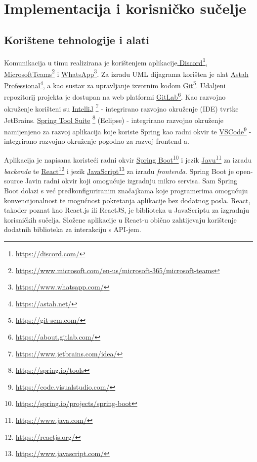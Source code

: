 \chapter{Implementacija i korisničko sučelje}
		
		\section{Korištene tehnologije i alati}
		
			
            Komunikacija u timu realizirana je korištenjem aplikacije\underline{ Discord}\footnote{\url{https://discord.com/}},\underline{ MicrosoftTeams}\footnote{\url{https://www.microsoft.com/en-us/microsoft-365/microsoft-teams}} i \underline{WhatsApp}\footnote{\url{https://www.whatsapp.com/}}. Za izradu UML dijagrama korišten je alat \underline{Astah Professional}\footnote{\url{https://astah.net/}}, a kao sustav za upravljanje izvornim kodom \underline{Git}\footnote{\url{https://git-scm.com/}}. Udaljeni repozitorij projekta je dostupan na web platformi \underline{GitLab}\footnote{\url{https://about.gitlab.com/}}.
            Kao razvojno okruženje korišteni su \underline{IntelliJ}
            \footnote{\url{https://www.jetbrains.com/idea/}} - integrirano razvojno okruženje (IDE) tvrtke JetBrains.
            \underline{Spring Tool Suite}
            \footnote{\url{https://spring.io/tools}} (Eclipse) - integrirano razvojno okruženje namijenjeno za razvoj aplikacija koje koriste Spring kao radni okvir te \underline{VSCode}\footnote{\url{https://code.visualstudio.com/}} - integrirano razvojno okruženje pogodno za razvoj frontend-a.
            
            Aplikacija je napisana koristeći  radni
            okvir \underline{Spring Boot}\footnote{\url{https://spring.io/projects/spring-boot}} i jezik \underline{Javu}\footnote{\url{https://www.java.com/}} za
            izradu \emph{backenda} te \underline{React}\footnote{\url{https://reactjs.org/}} i jezik \underline{JavaScript}\footnote{\url{https://www.javascript.com/}} za izradu \emph{frontenda}.
            Spring Boot je open-source Javin radni okvir koji omogućuje izgradnju mikro servisa. Sam Spring Boot dolazi s već predkonfiguriranim značajkama koje programerima omogućuju konvencijonalnost te mogućnost pokretanja aplikacije bez dodatnog posla. 
            React, također poznat kao React.js ili ReactJS, je biblioteka u JavaScriptu za izgradnju korisničkih
            sučelja. Složene aplikacije u React-u obično zahtijevaju korištenje dodatnih biblioteka za interakciju s API-jem.
            
